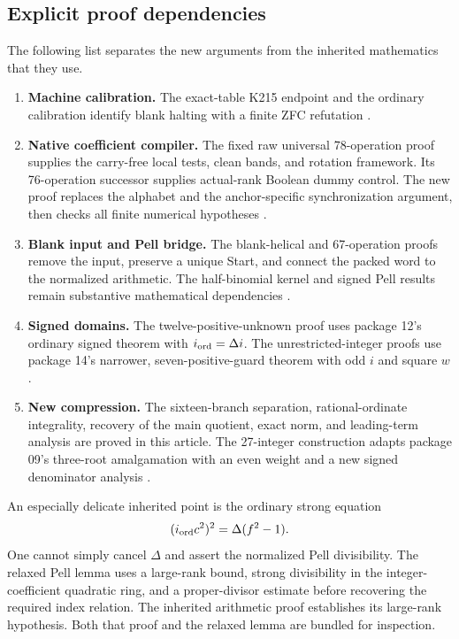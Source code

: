 \subsection{Explicit proof dependencies}

The following list separates the new arguments from the inherited
mathematics that they use.
\begin{enumerate}
\item \textbf{Machine calibration.}  The exact-table K215 endpoint and
      the ordinary calibration identify blank halting with a finite
      ZFC refutation \cite{RepoK215,RepoCalibration}.
\item \textbf{Native coefficient compiler.}  The fixed raw universal
      78-operation proof supplies the carry-free local tests, clean
      bands, and rotation framework.  Its 76-operation successor supplies
      actual-rank Boolean dummy control.  The new proof replaces the
      alphabet and the anchor-specific synchronization argument, then
      checks all finite numerical hypotheses \cite{RepoNative}.
\item \textbf{Blank input and Pell bridge.}  The blank-helical and
      67-operation proofs remove the input, preserve a unique Start,
      and connect the packed word to the normalized arithmetic.  The
      half-binomial kernel and signed Pell results remain substantive
      mathematical dependencies \cite{RepoBlank,RepoPell}.
\item \textbf{Signed domains.}  The twelve-positive-unknown proof uses
      package 12's ordinary signed theorem with
      $i_{\rm ord}=\Delta i$.  The unrestricted-integer proofs use
      package 14's narrower, seven-positive-guard theorem with odd $i$
      and square $w$ \cite{RepoSigned}.
\item \textbf{New compression.}  The sixteen-branch separation,
      rational-ordinate integrality, recovery of the main quotient,
      exact norm, and leading-term analysis are proved in this article.
      The 27-integer construction adapts package 09's three-root
      amalgamation with an even weight and a new signed denominator
      analysis \cite{RepoAmalgamation}.
\end{enumerate}

An especially delicate inherited point is the ordinary strong equation
\[
(i_{\rm ord}c^2)^2=\Delta(f^2-1).
\]
One cannot simply cancel $\Delta$ and assert the normalized Pell
divisibility.  The relaxed Pell lemma uses a large-rank bound, strong
divisibility in the integer-coefficient quadratic ring, and a
proper-divisor estimate before recovering the required index relation.
The inherited arithmetic proof establishes its large-rank hypothesis.
Both that proof and the relaxed lemma are bundled for inspection.

